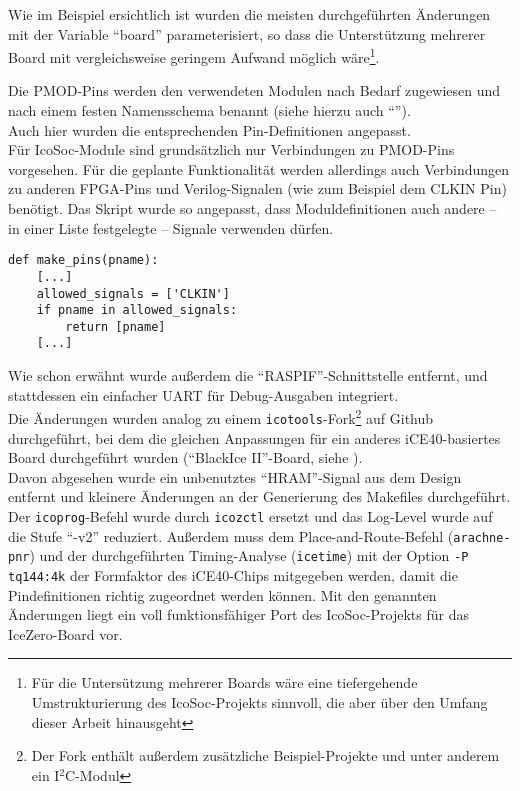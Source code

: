 {Wie im Beispiel ersichtlich ist wurden die meisten durchgeführten Änderungen mit der Variable ``board''  parameterisiert, so dass die Unterstützung mehrerer Board mit vergleichsweise geringem Aufwand möglich wäre\footnote{Für die Untersützung mehrerer Boards wäre eine tiefergehende Umstrukturierung des IcoSoc-Projekts sinnvoll, die aber über den Umfang dieser Arbeit hinausgeht}.

Die PMOD-Pins werden den verwendeten Modulen nach Bedarf zugewiesen und nach einem festen Namensschema benannt (siehe hierzu auch ``'').\\
Auch hier wurden die entsprechenden Pin-Definitionen angepasst.\\
Für IcoSoc-Module sind grundsätzlich nur Verbindungen zu PMOD-Pins vorgesehen. Für die geplante Funktionalität werden allerdings auch Verbindungen zu anderen FPGA-Pins und Verilog-Signalen (wie zum Beispiel dem CLKIN Pin) benötigt. Das Skript wurde so angepasst, dass Moduldefinitionen auch andere -- in einer Liste festgelegte --  Signale verwenden dürfen.
\begin{verbatim}
def make_pins(pname):
    [...]
    allowed_signals = ['CLKIN']
    if pname in allowed_signals:
        return [pname]
    [...]
\end{verbatim} 

Wie schon erwähnt wurde außerdem die ``RASPIF''-Schnittstelle entfernt, und stattdessen ein einfacher UART für Debug-Ausgaben integriert.\\
Die Änderungen wurden analog zu einem {\tt icotools}-Fork\footnote{Der Fork enthält außerdem zusätzliche Beispiel-Projekte und unter anderem ein I$^2$C-Modul} auf Github durchgeführt, bei dem die gleichen Anpassungen für ein anderes iCE40-basiertes Board durchgeführt wurden (``BlackIce II''-Board, siehe \cite{web:lawrie_fork}). \\
Davon abgesehen wurde ein unbenutztes ``HRAM''-Signal aus dem Design entfernt und kleinere Änderungen an der Generierung des Makefiles durchgeführt. Der {\tt icoprog}-Befehl wurde durch {\tt icozctl} ersetzt und das Log-Level wurde auf die Stufe ``-v2'' reduziert. Außerdem muss dem Place-and-Route-Befehl ({\tt arachne-pnr}) und der durchgeführten Timing-Analyse ({\tt icetime}) mit der Option {\tt -P tq144:4k} der Formfaktor des iCE40-Chips mitgegeben werden, damit die Pindefinitionen richtig zugeordnet werden können.   
Mit den genannten Änderungen liegt ein voll funktionsfähiger Port des IcoSoc-Projekts für das IceZero-Board vor.

}
